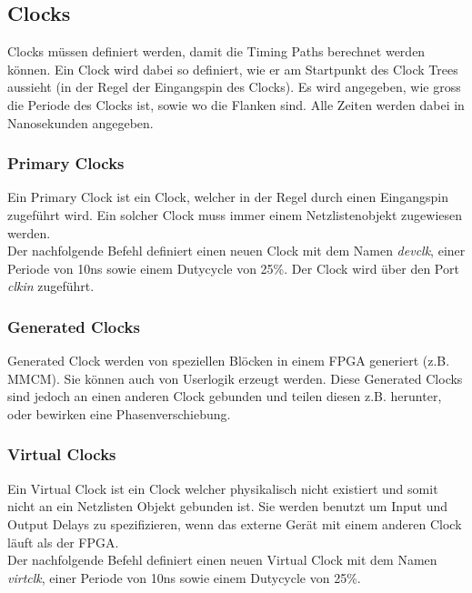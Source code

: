 \subsection{Clocks}
Clocks müssen definiert werden, damit die Timing Paths berechnet werden können. Ein Clock wird dabei so definiert, wie er am Startpunkt des Clock Trees aussieht (in der Regel der Eingangspin des Clocks). Es wird angegeben, wie gross die Periode des Clocks ist, sowie wo die Flanken sind. Alle Zeiten werden dabei in Nanosekunden angegeben.

\subsubsection{Primary Clocks}
Ein Primary Clock ist ein Clock, welcher in der Regel durch einen Eingangspin zugeführt wird. Ein solcher Clock muss immer einem Netzlistenobjekt zugewiesen werden. \\
Der nachfolgende Befehl definiert einen neuen Clock mit dem Namen \textit{devclk}, einer Periode von 10ns sowie einem Dutycycle von 25\%. Der Clock wird über den Port \textit{clkin} zugeführt.
 

\subsubsection{Generated Clocks}
Generated Clock werden von speziellen Blöcken in einem FPGA generiert (z.B. MMCM). Sie können auch von Userlogik erzeugt werden. Diese Generated Clocks sind jedoch an einen anderen Clock gebunden und teilen diesen z.B. herunter, oder bewirken eine Phasenverschiebung.

\subsubsection{Virtual Clocks}
Ein Virtual Clock ist ein Clock welcher physikalisch nicht existiert und somit nicht an ein Netzlisten Objekt gebunden ist. Sie werden benutzt um Input und Output Delays zu spezifizieren, wenn das externe Gerät mit einem anderen Clock läuft als der FPGA. \\
Der nachfolgende Befehl definiert einen neuen Virtual Clock mit dem Namen \textit{virtclk}, einer Periode von 10ns sowie einem Dutycycle von 25\%.


